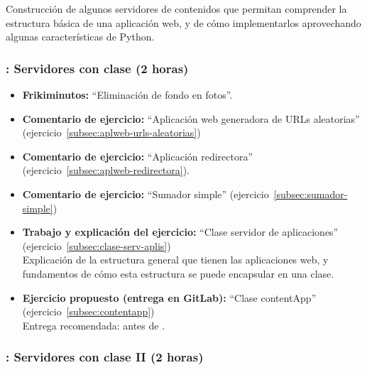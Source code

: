 \documentclass[a4paper,12pt]{article}
\begin{document}
Construcción de algunos servidores de contenidos que permitan comprender la estructura básica de una aplicación web, y de cómo implementarlos aprovechando algunas características de Python.

\subsubsection{\juevesE: Servidores con clase (2 horas)}
\label{cal:juevesE}

\begin{itemize}
\item \textbf{Frikiminutos:} ``Eliminación de fondo en fotos''.
\item \textbf{Comentario de ejercicio:} ``Aplicación web generadora de URLs aleatorias'' (ejercicio~\ref{subsec:aplweb-urls-aleatorias})
\item \textbf{Comentario de ejercicio:} ``Aplicación redirectora'' (ejercicio~\ref{subsec:aplweb-redirectora}).
\item \textbf{Comentario de ejercicio:} ``Sumador simple'' (ejercicio~\ref{subsec:sumador-simple}) 
\item \textbf{Trabajo y explicación del ejercicio:} ``Clase servidor de aplicaciones'' (ejercicio~\ref{subsec:clase-serv-aplis}) \\
  Explicación de la estructura general que tienen las aplicaciones web, y fundamentos de cómo esta estructura se puede encapsular en una clase.
\item \textbf{Ejercicio propuesto (entrega en GitLab):}  ``Clase contentApp'' (ejercicio~\ref{subsec:contentapp}) \\
  Entrega recomendada: antes de \juevesF.
\end{itemize}


\subsubsection{\juevesF: Servidores con clase II (2 horas)}
\label{cal:juevesF}
\end{document}
